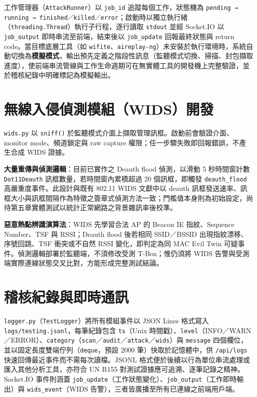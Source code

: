 \documentclass[12pt,a4paper,oneside]{report}
\begin{document}
工作管理器（\texttt{AttackRunner}）以 \texttt{job\_id} 追蹤每個工作，狀態機為 \texttt{pending → running → finished／killed／error}；啟動時以獨立執行緒（\texttt{threading.Thread}）執行子行程，逐行讀取 \texttt{stdout} 並經 Socket.IO 以 \texttt{job\_output} 即時串流至前端，結束後以 \texttt{job\_update} 回報最終狀態與 return code。當目標底層工具（如 \texttt{wifite}、\texttt{aireplay-ng}）未安裝於執行環境時，系統自動切換為\textbf{模擬模式}，輸出預先定義之階段性訊息（監聽模式切換、掃描、封包擷取進度），使前端串流管線與工作生命週期可在無實體工具的開發機上完整驗證，並於稽核紀錄中明確標記為模擬輸出。

\section{無線入侵偵測模組（WIDS）開發}
\texttt{wids.py} 以 \texttt{sniff()} 於監聽模式介面上擷取管理訊框。啟動前會驗證介面、monitor mode、頻道鎖定與 raw capture 權限；任一步驟失敗即回報錯誤，不產生合成 WIDS 證據。

\textbf{大量重傳與偵測邏輯}：目前已實作之 Deauth flood 偵測，以滑動 5 秒時間窗計數 \texttt{Dot11Deauth} 訊框數量，若時間窗內累積超過 20 個訊框，即觸發 \texttt{deauth\_flood} 高嚴重度事件。此設計與既有 802.11 WIDS 文獻中以 deauth 訊框發送速率、訊框大小與訊框間隔作為特徵之簽章式偵測方法一致\cite{sethuraman2019wids}；門檻值本身則為初始設定，尚待第五章實體測試以統計正常網路之背景雜訊率後校準。

\textbf{惡意熱點辨識演算法}：WIDS 先學習合法 AP 的 Beacon IE 指紋、Sequence Number、TSF 與 RSSI；Deauth flood 後若相同 SSID／BSSID 出現指紋漂移、序號回跳、TSF 衝突或不自然 RSSI 變化，即判定為同 MAC Evil Twin 可疑事件。偵測邏輯部署於監聽端，不須修改受測 T-Box；惟仍須將 WIDS 告警與受測端實際連線狀態交叉比對，方能形成完整測試結論。

\section{稽核紀錄與即時通訊}
\texttt{logger.py}（\texttt{TestLogger}）將所有模組事件以 JSON Lines 格式寫入 \texttt{logs/testing.jsonl}，每筆紀錄包含 \texttt{ts}（Unix 時間戳）、\texttt{level}（INFO／WARN／ERROR）、\texttt{category}（\texttt{scan}／\texttt{audit}／\texttt{attack}／\texttt{wids}）與 \texttt{message} 四個欄位，並以固定長度雙端佇列（\texttt{deque}，預設 2000 筆）快取於記憶體中，供 \texttt{/api/logs} 快速回傳最近事件而不需每次讀檔。JSONL 格式便於後續以行為單位串流處理或匯入其他分析工具，亦符合 UN R155 對測試證據應可追溯、逐筆記錄之精神。Socket.IO 事件則涵蓋 \texttt{job\_update}（工作狀態變化）、\texttt{job\_output}（工作即時輸出）與 \texttt{wids\_event}（WIDS 告警），三者皆廣播至所有已連線之前端用戶端。
\end{document}
